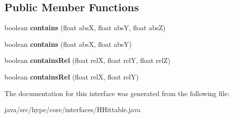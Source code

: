 \subsection*{Public Member Functions}
\begin{DoxyCompactItemize}
\item 
\hypertarget{interfacehype_1_1core_1_1interfaces_1_1_h_hittable_a1b13f540061466c58a70fed2833a1aab}{boolean {\bfseries contains} (float abs\-X, float abs\-Y, float abs\-Z)}\label{interfacehype_1_1core_1_1interfaces_1_1_h_hittable_a1b13f540061466c58a70fed2833a1aab}

\item 
\hypertarget{interfacehype_1_1core_1_1interfaces_1_1_h_hittable_a7fc02dd052a407912749a33a21601cc3}{boolean {\bfseries contains} (float abs\-X, float abs\-Y)}\label{interfacehype_1_1core_1_1interfaces_1_1_h_hittable_a7fc02dd052a407912749a33a21601cc3}

\item 
\hypertarget{interfacehype_1_1core_1_1interfaces_1_1_h_hittable_a44b35ac85de231a1158c2be21b98d38c}{boolean {\bfseries contains\-Rel} (float rel\-X, float rel\-Y, float rel\-Z)}\label{interfacehype_1_1core_1_1interfaces_1_1_h_hittable_a44b35ac85de231a1158c2be21b98d38c}

\item 
\hypertarget{interfacehype_1_1core_1_1interfaces_1_1_h_hittable_a9e5b63fc71fc4ee5b3dbffcdb2052ee6}{boolean {\bfseries contains\-Rel} (float rel\-X, float rel\-Y)}\label{interfacehype_1_1core_1_1interfaces_1_1_h_hittable_a9e5b63fc71fc4ee5b3dbffcdb2052ee6}

\end{DoxyCompactItemize}


The documentation for this interface was generated from the following file\-:\begin{DoxyCompactItemize}
\item 
java/src/hype/core/interfaces/H\-Hittable.\-java\end{DoxyCompactItemize}
